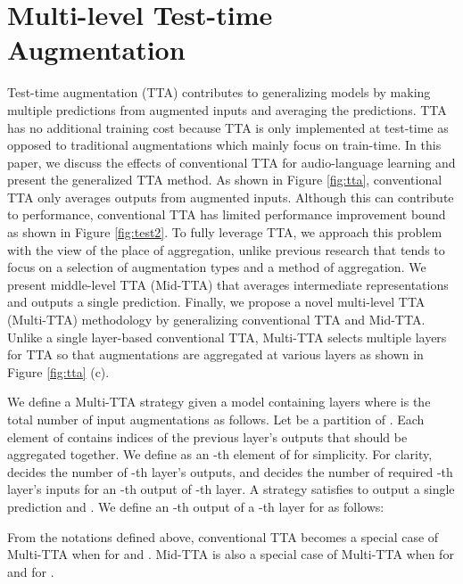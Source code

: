 \documentclass{INTERSPEECH2023}
\begin{document}
\section{Multi-level Test-time Augmentation}
\label{sec:pagestyle}

Test-time augmentation (TTA) contributes to generalizing models by making multiple predictions from augmented inputs and averaging the predictions. TTA has no additional training cost because TTA is only implemented at test-time as opposed to traditional augmentations which mainly focus on train-time. In this paper, we discuss the effects of conventional TTA for audio-language learning and present the generalized TTA method. As shown in Figure \ref{fig:tta}, conventional TTA only averages outputs from augmented inputs. Although this can contribute to performance, conventional TTA has limited performance improvement bound as shown in Figure \ref{fig:test2}.
To fully leverage TTA, we approach this problem with the view of the place of aggregation, unlike previous research \cite{kim2020learning, shanmugam2021better} that tends to focus on a selection of augmentation types and a method of aggregation. We present middle-level TTA (Mid-TTA) that averages intermediate representations and outputs a single prediction. Finally, we propose a novel multi-level TTA (Multi-TTA) methodology by generalizing conventional TTA and Mid-TTA. Unlike a single layer-based conventional TTA, Multi-TTA selects multiple layers for TTA so that augmentations are aggregated at various layers as shown in Figure \ref{fig:tta} (c).


We define a Multi-TTA strategy  given a model  containing  layers where  is the total number of input augmentations as follows. Let  be a partition of . Each element of  contains indices of the previous layer's outputs that should be aggregated together. We define  as an -th element of  for simplicity. For clarity,  decides the number of -th layer's outputs, and  decides the number of required -th layer's inputs for an -th output of -th layer. A strategy  satisfies  to output a single prediction and . We define an -th output of a -th layer  for  as follows:

From the notations defined above, conventional TTA becomes a special case of Multi-TTA when  for  and . Mid-TTA is also a special case of Multi-TTA when  for  and  for .
\end{document}
